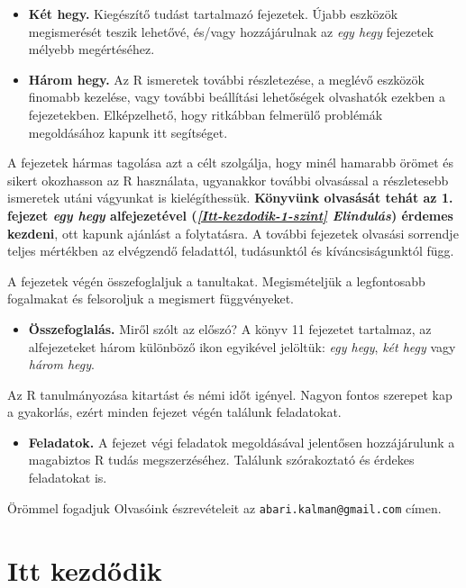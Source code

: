 \documentclass[
]{book}
\newenvironment{rmdblock}[1]
  {\begin{shaded*}
  \begin{itemize}
  \renewcommand{\labelitemi}{
    \raisebox{-.7\height}[0pt][0pt]{
      {\setkeys{Gin}{width=3em,keepaspectratio}\texttt{[image: images/\#1]}}
    }
  }
  \item
  }
  {
  \end{itemize}
  \end{shaded*}
  }
\newenvironment{rmdlevel2}
  {\begin{rmdblock}{level2}}
  {\end{rmdblock}}
\newenvironment{rmdlevel3}
  {\begin{rmdblock}{level3}}
  {\end{rmdblock}}
\newenvironment{rmdsummary}
  {\begin{rmdblock}{summary}}
  {\end{rmdblock}}
\newenvironment{rmdexercise}
  {\begin{rmdblock}{exercise}}
  {\end{rmdblock}}
\begin{document}
\begin{rmdlevel2}
\textbf{Két hegy.} Kiegészítő tudást tartalmazó fejezetek. Újabb
eszközök megismerését teszik lehetővé, és/vagy hozzájárulnak az
\emph{egy hegy} fejezetek mélyebb megértéséhez.
\end{rmdlevel2}

\begin{rmdlevel3}
\textbf{Három hegy.} Az R ismeretek további részletezése, a meglévő
eszközök finomabb kezelése, vagy további beállítási lehetőségek
olvashatók ezekben a fejezetekben. Elképzelhető, hogy ritkábban
felmerülő problémák megoldásához kapunk itt segítséget.
\end{rmdlevel3}

A fejezetek hármas tagolása azt a célt szolgálja, hogy minél hamarabb örömet és sikert okozhasson az R használata, ugyanakkor további olvasással a részletesebb ismeretek utáni vágyunkat is kielégíthessük. \textbf{Könyvünk olvasását tehát az 1. fejezet \emph{egy hegy} alfejezetével (\emph{\ref{Itt-kezdodik-1-szint} Elindulás}) érdemes kezdeni}, ott kapunk ajánlást a folytatásra. A további fejezetek olvasási sorrendje teljes mértékben az elvégzendő feladattól, tudásunktól és kíváncsiságunktól függ.

A fejezetek végén összefoglaljuk a tanultakat. Megismételjük a legfontosabb fogalmakat és felsoroljuk a megismert függvényeket.

\begin{rmdsummary}
\textbf{Összefoglalás.} Miről szólt az előszó? A könyv 11 fejezetet
tartalmaz, az alfejezeteket három különböző ikon egyikével jelöltük:
\emph{egy hegy}, \emph{két hegy} vagy \emph{három hegy}.
\end{rmdsummary}

Az R tanulmányozása kitartást és némi időt igényel. Nagyon fontos szerepet kap a gyakorlás, ezért minden fejezet végén találunk feladatokat.

\begin{rmdexercise}
\textbf{Feladatok.} A fejezet végi feladatok megoldásával jelentősen
hozzájárulunk a magabiztos R tudás megszerzéséhez. Találunk szórakoztató
és érdekes feladatokat is.
\end{rmdexercise}

Örömmel fogadjuk Olvasóink észrevételeit az \texttt{abari.kalman@gmail.com} címen.

\hypertarget{itt-kezdodik}{%
\chapter{Itt kezdődik}\label{itt-kezdodik}}
\end{document}
